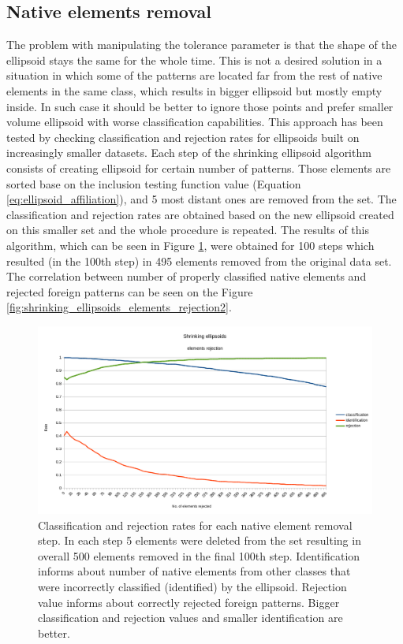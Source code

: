 \subsection{Native elements removal}

The problem with manipulating the tolerance parameter is that the shape of the ellipsoid stays the same for the whole time. This is not a desired solution in a situation in which some of the patterns are located far from the rest of native elements in the same class, which results in bigger ellipsoid but mostly empty inside. In such case it should be better to ignore those points and prefer smaller volume ellipsoid with worse classification capabilities. This approach has been tested by checking classification and rejection rates for ellipsoids built on increasingly smaller datasets. Each step of the shrinking ellipsoid algorithm consists of creating ellipsoid for certain number of patterns. Those elements are sorted base on the inclusion testing function value (Equation \ref{eq:ellipsoid_affiliation}), and 5 most distant ones are removed from the set. The classification and rejection rates are obtained based on the new ellipsoid created on this smaller set and the whole procedure is repeated. The results of this algorithm, which can be seen in Figure \ref{fig:shrinking_ellipsoids_elements_rejection}, were obtained for 100 steps which resulted (in the 100th step) in 495 elements removed from the original data set. The correlation between number of properly classified native elements and rejected foreign patterns can be seen on the Figure \ref{fig:shrinking_ellipsoids_elements_rejection2}.

\begin{figure}[htp]
	\centering
	\includegraphics[width=1.\textwidth]{Figures/shrinking_ellipsoid_elements_rejection.png}
	\caption{ Classification and rejection rates for each native element removal step. In each step 5 elements were deleted from the set resulting in overall 500 elements removed in the final 100th step. Identification informs about number of native elements from other classes that were incorrectly classified (identified) by the ellipsoid. Rejection value informs about correctly rejected foreign patterns. Bigger classification and rejection values and smaller identification are better. }
	\label{fig:shrinking_ellipsoids_elements_rejection}\vspace{-3pt}
\end{figure}

